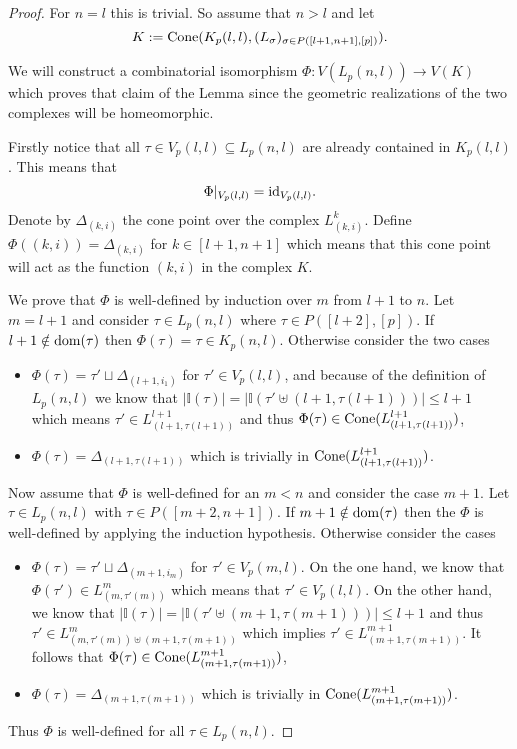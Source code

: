 \begin{proof}
  For $n = l$ this is trivial. So assume that $n > l$ and let \[K := {\rm Cone}(K_p(l,l), (L_\sigma)_{\sigma \in P([l+1,n+1],[p])}).\]
  
  We will construct a combinatorial isomorphism $\Phi\colon V(L_p(n,l)) \to V(K)$ which proves that claim of the Lemma since the geometric realizations of the two complexes will be homeomorphic.
  
  Firstly notice that all $\tau \in V_p(l,l) \subseteq L_p(n,l)$ are already contained in $K_p(l,l)$. This means that \[\Phi|_{V_p(l,l)} = {\rm id}_{V_p(l,l)}.\] 
  Denote by $\Delta_{(k,i)}$ the cone point over the complex $L^k_{(k,i)}$. Define $\Phi((k,i)) = \Delta_{(k,i)}$ for $k \in [l+1,n+1]$ which means that this cone point will act as the function $(k,i)$ in the complex $K$.

  We prove that $\Phi$ is well-defined by induction over $m$ from $l+1$ to $n$. Let $m = l+1$ and consider $\tau \in L_p(n,l)$ where $\tau \in P([l+2],[p])$. If $l+1 \notin {\rm dom}(\tau)$ then $\Phi(\tau) = \tau \in K_p(n,l)$. Otherwise consider the two cases
  \begin{itemize}
    \item $\Phi(\tau) = \tau' \sqcup \Delta_{(l+1, i_1)}$ for $\tau' \in V_p(l,l)$, and because of the definition of $L_p(n,l)$ we know that $|\mathbb{I}(\tau)| = |\mathbb{I}(\tau' \uplus (l+1,\tau(l+1)))| \leq l+1$ which means $\tau' \in L^{l+1}_{(l+1,\tau(l+1))}$ and thus $\Phi(\tau) \in {\rm Cone}(L^{l+1}_{(l+1,\tau(l+1))})$,
    \item $\Phi(\tau) = \Delta_{(l+1,\tau(l+1))}$ which is trivially in ${\rm Cone}(L^{l+1}_{(l+1,\tau(l+1))})$.
    \end{itemize}
    Now assume that $\Phi$ is well-defined for an $m < n$ and consider the case $m+1$. Let $\tau \in L_p(n,l)$ with $\tau \in P([m+2, n+1])$. If $m+1 \notin {\rm dom}(\tau)$ then the $\Phi$ is well-defined by applying the induction hypothesis. Otherwise consider the cases
    \begin{itemize}
      \item $\Phi(\tau) = \tau' \sqcup \Delta_{(m+1,i_m)}$ for $\tau' \in V_p(m,l)$. On the one hand, we know that $\Phi(\tau') \in L^m_{(m,\tau'(m))}$ which means that $\tau'\in V_p(l,l)$. On the other hand, we know that $|\mathbb{I}(\tau)| = |\mathbb{I}(\tau'\uplus (m+1,\tau(m+1)))| \leq l+1$ and thus $\tau' \in L^m_{(m,\tau'(m))\uplus(m+1, \tau(m+1))}$ which implies $\tau' \in L^{m+1}_{(m+1,\tau(m+1))}$. It follows that $\Phi(\tau) \in {\rm Cone}(L^{m+1}_{(m+1,\tau(m+1))})$,
      \item $\Phi(\tau) = \Delta_{(m+1,\tau(m+1))}$ which is trivially in ${\rm Cone}(L^{m+1}_{(m+1,\tau(m+1))})$.
    \end{itemize}
    Thus $\Phi$ is well-defined for all $\tau \in L_p(n,l)$.


\end{proof}
